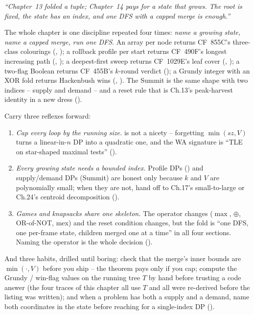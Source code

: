 \begin{lastword}
\emph{``Chapter~13 folded a tuple; Chapter~14 pays for a state that grows.
The root is fixed, the state has an index, and one DFS with a capped
merge is enough.''}

\medskip
The whole chapter is one discipline repeated four times: \emph{name a
growing state, name a capped merge, run one DFS}. An array per node
returns CF~855C's three-class colourings (,
); a rollback profile per start returns CF~490F's
longest increasing path (, );
a deepest-first sweep returns CF~1029E's leaf cover
(, ); a two-flag
Boolean returns CF~455B's $k$-round verdict ();
a Grundy integer with an XOR fold returns Hackenbush wins
(, ). The Summit is the
same shape with two indices -- supply and demand -- and a reset rule that
is Ch.13's peak-harvest identity in a new dress ().

\medskip
Carry three reflexes forward:
\begin{enumerate}[nosep, leftmargin=1.6em]
  \item \emph{Cap every loop by the running size.} 
        is not a nicety -- forgetting $\min(\mathit{sz}, V)$ turns a
        linear-in-$n$ DP into a quadratic one, and the WA signature is
        ``TLE on star-shaped maximal tests'' ().
  \item \emph{Every growing state needs a bounded index.} Profile DPs
        () and supply/demand DPs (Summit) are honest
        only because $k$ and $V$ are polynomially small; when they are not,
        hand off to Ch.17's small-to-large or Ch.24's centroid
        decomposition ().
  \item \emph{Games and knapsacks share one skeleton.} The operator
        changes ($\max$, $\oplus$, OR-of-NOT, mex) and the reset condition
        changes, but the fold is ``one DFS, one per-frame state, children
        merged one at a time'' in all four sections. Naming the operator
        is the whole decision ().
\end{enumerate}

\medskip
And three habits, drilled until boring: check that the merge's inner bounds
are $\min(\cdot, V)$ before you ship -- the theorem pays only if you cap;
compute the Grundy / win-flag values on the running tree $T$ by hand before
trusting a code answer (the four traces of this chapter all use $T$ and all
were re-derived before the listing was written); and when a problem has both
a supply and a demand, name both coordinates in the state before reaching for
a single-index DP ().


\end{lastword}
